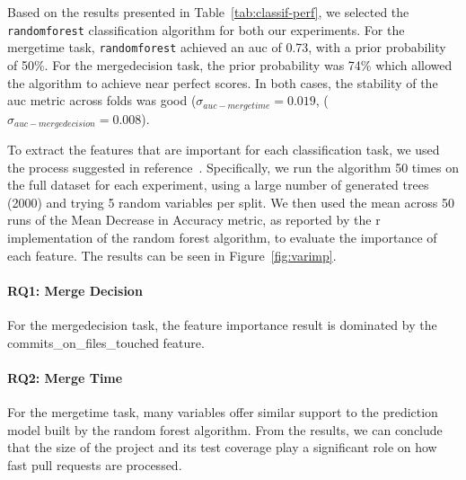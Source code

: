 \documentclass{sig-alternate}
\begin{document}
Based on the results presented in Table~\ref{tab:classif-perf},
we selected the \texttt{randomforest} classification algorithm for
both our experiments. For the \textsf{mergetime} task, \texttt{randomforest}
achieved an {\sc auc} of 0.73, with a prior probability of 50\%. For 
the \textsf{mergedecision} task, the prior probability was 74\% which
allowed the algorithm to achieve near perfect scores. In both cases,
the stability of the {\sc auc} metric across folds was good 
($\sigma_{auc-mergetime} = 0.019$, ($\sigma_{auc-mergedecision} = 0.008$).

\begin{figure*}
\centering
{}
\caption{Random forest feature importance for predicting merge decision (a) and merge time (b)}
\label{fig:varimp}
\end{figure*}

To extract the features that are important for each classification task, we
used the process suggested in reference~\cite{Genue10}. Specifically, we run
the algorithm 50 times on the full dataset for each experiment, using a large
number of generated trees (2000) and trying 5 random variables per split. We
then used the mean across 50 runs of the  Mean Decrease in Accuracy metric, as
reported by the {\sc r} implementation of the random forest algorithm, to
evaluate the importance of each feature. The results can be seen in
Figure~\ref{fig:varimp}.

\paragraph{RQ1: Merge Decision}

For the \textsf{mergedecision} task, the feature importance result is dominated
by the \textsf{commits\_on\_files\_touched} feature. 

\paragraph{RQ2: Merge Time}

For the \textsf{mergetime} task, many variables offer similar support to the
prediction model built by the random forest algorithm. From the results, we can
conclude that the size of the project and its test coverage play a significant
role on how fast pull requests are processed. 
\end{document}
